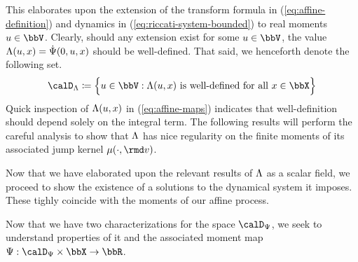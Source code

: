 This elaborates upon the extension of the transform formula in (\ref{eq:affine-definition}) and dynamics in (\ref{eq:riccati-system-bounded}) to real moments $\momentVar \in \vecSpace$. 
Clearly, should any extension exist for some $\momentVar \in \vecSpace$, the value $\Lambda(u, x) = \dot{\Psi}(0,u,x)$ should be well-defined.
That said, we henceforth denote the following set.
\begin{equation*}
  \odeSpace \defeq \Big\{ \momentVar \in \vecSpace : \ode(\momentVar, \stateVar) \text{ is well-defined for all } \stateVar \in \stateSpace \Big\}
\end{equation*}
Quick inspection of $\Lambda(u, x)$ in (\ref{eq:affine-maps}) indicates that well-definition should depend solely on the integral term.
The following results will perform the careful analysis to show that $\Lambda$ has nice regularity on the finite moments of its associated jump kernel $\affJump(\cdot,\rmd\markVar)$.













Now that we have elaborated upon the relevant results of $\Lambda$ as a scalar field, we proceed to show the existence of a solutions to the dynamical system it imposes.
These tighly coincide with the moments of our affine process.






Now that we have two characterizations for the space $\momentSpace$, we seek to understand properties of it and the associated moment map $\aff: \momentSpace \times \stateSpace \rightarrow \bbR$.









